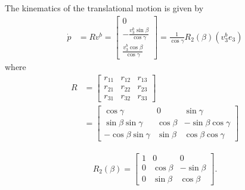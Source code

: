 The kinematics of the translational motion is given by
\begin{align}
    \label{eq:kinematics_of_translation}
    \dot{p} &= Rv^b = 
    \begin{bmatrix}
        0\\
        - \frac{v_3^b \sin \beta}{\cos \gamma}\\
        \frac{v_3^b \cos \beta}{\cos \gamma}
    \end{bmatrix}
    = \frac{1}{\cos \gamma} R_2(\beta) (v_3^b e_3)
\end{align}
where
\begin{align}
    R &=
    \begin{bmatrix}
        r_{11} & r_{12} & r_{13} \\
        r_{21} & r_{22} & r_{23} \\
        r_{31} & r_{32} & r_{33}
    \end{bmatrix}\\
    &=
    \begin{bmatrix}
        \cos \gamma & 0 & \sin \gamma \\
        \sin \beta \sin \gamma & \cos \beta & - \sin \beta \cos \gamma \\
        - \cos \beta \sin \gamma & \sin \beta & \cos \beta \cos \gamma
    \end{bmatrix}
    \label{eq:rotation_matrix}
\end{align}

\begin{align}
    \label{eq:definition_of_R_2}
    R_2(\beta) =
    \begin{bmatrix}
        1 & 0 & 0 \\
        0 & \cos \beta & - \sin \beta \\
        0 & \sin \beta & \cos \beta
    \end{bmatrix}.
\end{align}

